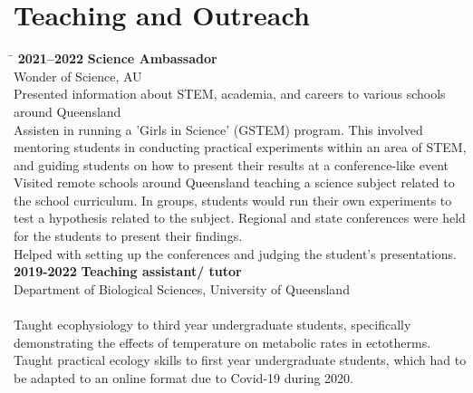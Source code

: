 \documentclass[a4paper,11pt,english]{article}
\begin{document}
\section*{Teaching and Outreach}
\begin{flushleft}
	\begin{tabbing}
		\hspace{2in}\=\kill
		\textbf{2021--2022} \> \textbf{Science Ambassador}  \\
		\> Wonder of Science, AU    \\
		\> {Presented information about STEM, academia, and careers to various schools around Queensland}   \\
		\> {Assisten in running a 'Girls in Science' (GSTEM) program. This involved mentoring students in conducting practical experiments within an area of STEM, and guiding students on how to present their results at a conference-like event}\\
		\> {Visited remote schools around Queensland teaching a science subject related to the school curriculum. In groups, students would run their own experiments to test a hypothesis related to the subject. Regional and state conferences were held for the students to present their findings.}\\
		\> {Helped with setting up the conferences and judging the student's presentations.}
		\>  \\  %
		\textbf{2019-2022} \> \textbf{Teaching assistant/ tutor}       \\
		\> Department of Biological Sciences, University of Queensland  \\
		  \\
		\> {Taught ecophysiology to third year undergraduate students, specifically demonstrating the effects of temperature on metabolic rates in ectotherms.}\\
		\> {Taught practical ecology skills to first year undergraduate students, which had to be adapted to an online format due to Covid-19 during 2020.}
		
	
		\>   \\                                         
	\end{tabbing}	
	\>   \\ 
\end{flushleft}
\end{document}
